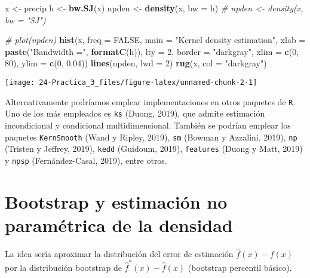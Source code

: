 \documentclass[
]{book}
\newenvironment{Shaded}{\begin{snugshade}}{\end{snugshade}}
\newcommand{\CommentTok}[1]{\textcolor[rgb]{0.56,0.35,0.01}{\textit{#1}}}
\newcommand{\DataTypeTok}[1]{\textcolor[rgb]{0.13,0.29,0.53}{#1}}
\newcommand{\DecValTok}[1]{\textcolor[rgb]{0.00,0.00,0.81}{#1}}
\newcommand{\FloatTok}[1]{\textcolor[rgb]{0.00,0.00,0.81}{#1}}
\newcommand{\KeywordTok}[1]{\textcolor[rgb]{0.13,0.29,0.53}{\textbf{#1}}}
\newcommand{\NormalTok}[1]{#1}
\newcommand{\OtherTok}[1]{\textcolor[rgb]{0.56,0.35,0.01}{#1}}
\newcommand{\StringTok}[1]{\textcolor[rgb]{0.31,0.60,0.02}{#1}}
\theoremstyle{definition}
\theoremstyle{definition}
\theoremstyle{definition}
\theoremstyle{remark}
\begin{document}
\begin{Shaded}
\begin{Highlighting}[]
\NormalTok{x <-}\StringTok{ }\NormalTok{precip}
\NormalTok{h <-}\StringTok{ }\KeywordTok{bw.SJ}\NormalTok{(x)}
\NormalTok{npden <-}\StringTok{ }\KeywordTok{density}\NormalTok{(x, }\DataTypeTok{bw =}\NormalTok{ h)}
\CommentTok{# npden <- density(x, bw = "SJ")}

\CommentTok{# plot(npden)}
\KeywordTok{hist}\NormalTok{(x, }\DataTypeTok{freq =} \OtherTok{FALSE}\NormalTok{, }\DataTypeTok{main =} \StringTok{"Kernel density estimation"}\NormalTok{,}
     \DataTypeTok{xlab =} \KeywordTok{paste}\NormalTok{(}\StringTok{"Bandwidth ="}\NormalTok{, }\KeywordTok{formatC}\NormalTok{(h)), }\DataTypeTok{lty =} \DecValTok{2}\NormalTok{,}
     \DataTypeTok{border =} \StringTok{"darkgray"}\NormalTok{, }\DataTypeTok{xlim =} \KeywordTok{c}\NormalTok{(}\DecValTok{0}\NormalTok{, }\DecValTok{80}\NormalTok{), }\DataTypeTok{ylim =} \KeywordTok{c}\NormalTok{(}\DecValTok{0}\NormalTok{, }\FloatTok{0.04}\NormalTok{))}
\KeywordTok{lines}\NormalTok{(npden, }\DataTypeTok{lwd =} \DecValTok{2}\NormalTok{)}
\KeywordTok{rug}\NormalTok{(x, }\DataTypeTok{col =} \StringTok{"darkgray"}\NormalTok{)}
\end{Highlighting}
\end{Shaded}

\begin{center}\texttt{[image: 24-Practica\_3\_files/figure-latex/unnamed-chunk-2-1]} \end{center}

Alternativamente podríamos emplear implementaciones en otros paquetes de \texttt{R}.
Uno de los más empleados es \texttt{ks} (Duong, 2019), que admite estimación
incondicional y condicional multidimensional.
También se podrían emplear los paquetes \texttt{KernSmooth} (Wand y Ripley, 2019),
\texttt{sm} (Bowman y Azzalini, 2019), \texttt{np} (Tristen y Jeffrey, 2019),
\texttt{kedd} (Guidoum, 2019), \texttt{features} (Duong y Matt, 2019) y \texttt{npsp} (Fernández-Casal, 2019),
entre otros.

\hypertarget{bootstrap-y-estimaciuxf3n-no-paramuxe9trica-de-la-densidad}{%
\section{Bootstrap y estimación no paramétrica de la densidad}\label{bootstrap-y-estimaciuxf3n-no-paramuxe9trica-de-la-densidad}}

La idea sería aproximar la distribución del error de estimación
\(\hat f(x) - f(x)\) por la distribución bootstrap de
\(\hat f^{\ast}(x) - \hat f(x)\) (bootstrap percentil básico).
\end{document}
